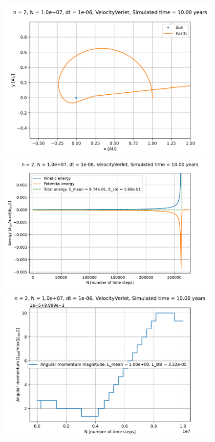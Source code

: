 \documentclass[reprint,english,notitlepage]{revtex4-1}  %
\begin{document}
\begin{figure}[H]
\includegraphics[scale=0.5]{../data/figures/varyingbeta/se_peturbed_beta3_vv_orbits2D.pdf}
\includegraphics[scale=0.5]{../data/figures/varyingbeta/se_peturbed_beta3_vv_energy_zoomed.pdf}
\includegraphics[scale=0.5]{../data/figures/varyingbeta/se_peturbed_beta3_vv_angmom.pdf}

\end{figure}
\end{document}
